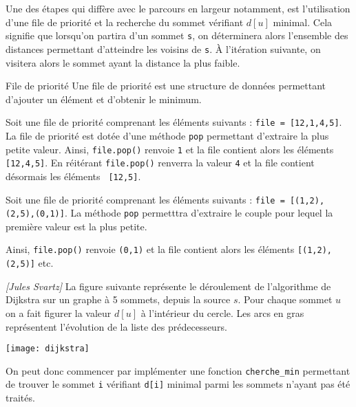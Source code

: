 Une des étapes qui diffère avec le parcours en largeur notamment, est l'utilisation d'une file de priorité et la recherche du sommet vérifiant $d[u]$ minimal. Cela signifie que lorsqu'on partira d'un sommet \texttt{s}, on déterminera alors l'ensemble des distances permettant d'atteindre les voisins de \texttt{s}. \`A l'itération suivante, on visitera alors le sommet ayant la distance la plus faible.

\begin{defi}{File de priorité}
Une file de priorité est une structure de données permettant d’ajouter
un élément et d’obtenir le minimum.
\end{defi}

\begin{exemple}
Soit une file de priorité comprenant les éléments suivants : \texttt{file = [12,1,4,5]}. La file de priorité est dotée d'une méthode \texttt{pop} permettant d'extraire la plus petite valeur. 
Ainsi, \texttt{file.pop()} renvoie \texttt{1} et la file contient alors les éléments \texttt{ [12,4,5]}. 
En réitérant \texttt{file.pop()} renverra la valeur \texttt{4} et la file contient désormais  les éléments \texttt{ [12,5]}.


Soit une file de priorité comprenant les éléments suivants : \texttt{file = [(1,2),(2,5),(0,1)]}. La méthode \texttt{pop} permetttra d'extraire le couple pour lequel la première valeur est la plus petite. 

Ainsi, \texttt{file.pop()} renvoie \texttt{(0,1)} et la file contient alors les éléments \texttt{[(1,2),(2,5)]} etc.

\end{exemple}


\begin{exemple} \textit{[Jules Svartz]} 
La figure suivante représente le déroulement de l’algorithme de Dijkstra sur un graphe à 5 sommets, depuis 
la source $s$. Pour chaque sommet $u$ on a fait figurer la valeur $d[u]$ à l’intérieur du cercle. Les arcs en gras représentent
l’évolution de la liste des prédecesseurs.

\begin{center}
\texttt{[image: dijkstra]}
\end{center}
\end{exemple}

On peut donc commencer par implémenter une fonction \texttt{cherche\_min} permettant de trouver le sommet \texttt{i} vérifiant \texttt{d[i]} minimal
parmi les sommets n'ayant pas été traités.%


